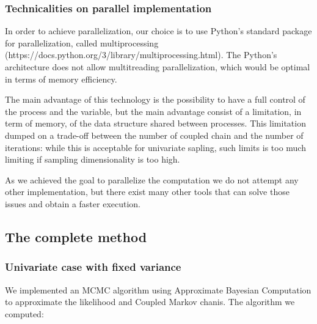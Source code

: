 \documentclass {article}
\begin{document}
\clearpage

\subsubsection{Technicalities on parallel implementation}

In order to achieve parallelization, our choice is to use Python's standard package for parallelization, called multiprocessing (https://docs.python.org/3/library/multiprocessing.html). The Python's architecture does not allow multitreading parallelization, which would be optimal in terms of memory efficiency.

The main advantage of this technology is the possibility to have a full control of the process and the variable, but the main advantage consist of a limitation, in term of memory, of the data structure shared between processes. This limitation dumped on a trade-off between the number of coupled chain and the number of iterations: while this is acceptable for univariate sapling, such limits is too much limiting if sampling dimensionality is too high.

As we achieved the goal to parallelize the computation we do not attempt any other implementation, but there exist many other tools that can solve those issues and obtain a faster execution.

 
\clearpage

\subsection{The complete method}

\subsubsection{Univariate case with fixed variance}

We implemented an MCMC algorithm using Approximate Bayesian Computation to approximate the likelihood and Coupled Markov chanis.
The algorithm we computed: 
\end{document}
